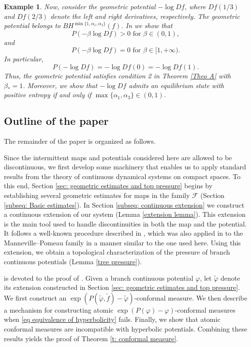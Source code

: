 \documentclass[10pt,a4paper]{amsart}
\numberwithin{equation}{section} %
\numberwithin{figure}{section} %
\newtheorem{exam}[prop]{Example}
\newcommand{\sF}{\mathscr{F}}
\renewcommand{\=}{\coloneqq}
\begin{document}
\begin{exam}
    Now, consider the geometric potential $-\log Df$, where $Df(1/3)$ and $Df(2/3)$ denote the left and right derivatives, respectively. The geometric potential belongs to $BH^{\min\{1,\alpha_1,\alpha_3\}}(f)$. In  \cite{CoronelMonardes} we show that
    \begin{equation*}
         P(-\beta\log Df) > 0 \text{ for }\beta\in(0,1),
    \end{equation*}
    and
    \begin{equation*}
         P(-\beta\log Df) =0 \text{ for }\beta\in [1,+\infty). 
    \end{equation*}
    In particular,
    \begin{equation*}
        P(-\log Df) = -\log Df(0) = -\log Df(1).
    \end{equation*}
    Thus, the geometric potential satisfies condition 2 in Theorem \ref{Theo A} with $\beta_* = 1$.
    Moreover, we show that $-\log Df$ admits an equilibrium state with positive entropy if and only if $\max\{\alpha_1,\alpha_3\} \in (0,1)$.
\end{exam}

\subsection{Outline of the paper}

The remainder of the paper is organized as follows.

Since the intermittent maps and potentials considered here are allowed to be discontinuous, we first develop some machinery that enables us to apply standard results from the theory of continuous dynamical systems on compact spaces. To this end, Section \ref{sec: geometric estimates and top pressure} begins by establishing several geometric estimates for maps in the family $\sF$ (Section \ref{subseq: Basic estimates}). In Section \ref{subseq: continuous extension} we construct a continuous extension of our system (Lemma \ref{extension lemma}). This extension is the main tool used to handle discontinuities in both the map and the potential. It follows a well-known procedure described in \cite[Appendix A.5]{Keller2}, which was also applied in \cite{coronelRivera1} to the Manneville--Pomeau family in a manner similar to the one used here. Using this extension, we obtain a topological characterization of the pressure of branch continuous potentials (Lemma \ref{tree pressure}).

 is devoted to the proof of . Given a branch continuous potential $\varphi$, let $\widetilde{\varphi}$ denote its extension constructed in Section \ref{sec: geometric estimates and top pressure}. We first construct an $\exp(P(\widetilde{\varphi},\widetilde{f})-\widetilde{\varphi})$-conformal measure. We then describe a mechanism for constructing atomic $\exp(P(\varphi)-\varphi)$-conformal measures when \eqref{eq equivalence of hyperbolicity} fails. Finally, we show that atomic conformal measures are incompatible with hyperbolic potentials. Combining these results yields the proof of Theorem \ref{t: conformal measure}.
\end{document}
